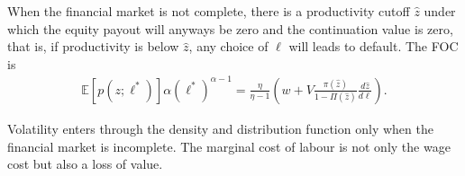 \documentclass[12pt]{article}
\numberwithin{equation}{section}
\begin{document}
When the financial market is not complete, there is a productivity cutoff $\hat z$ under which the equity payout will anyways be zero and the continuation value is zero, that is, if productivity is below $\hat z$, any choice of $\ell$ will leads to default. The FOC is
\begin{align*}
	\mathbb{E}[p(z;\ell^*)]\alpha (\ell^*)^{\alpha-1} = \frac{\eta}{\eta-1} \left(w + V \frac{\pi(\hat z)}{1-\Pi(\hat z)}\frac{d \hat z}{d \ell}\right).
\end{align*}

Volatility enters through the density and distribution function only when the financial market is incomplete. The marginal cost of labour is not only the wage cost but also a loss of value.







\end{document}
